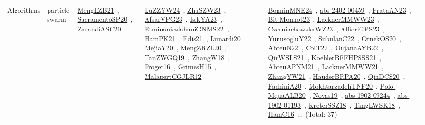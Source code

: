 {\begin{longtable}{lp{3cm}>{\raggedright\arraybackslash}p{6cm}>{\raggedright\arraybackslash}p{6cm}>{\raggedright\arraybackslash}p{8cm}}
\index{particle swarm}\index{Algorithms!particle swarm}Algorithms & particle swarm & \href{../works/MengLZB21.pdf}{MengLZB21}~\cite{MengLZB21}, \href{../works/SacramentoSP20.pdf}{SacramentoSP20}~\cite{SacramentoSP20}, \href{../works/ZarandiASC20.pdf}{ZarandiASC20}~\cite{ZarandiASC20} & \href{../works/LuZZYW24.pdf}{LuZZYW24}~\cite{LuZZYW24}, \href{../works/ZhuSZW23.pdf}{ZhuSZW23}~\cite{ZhuSZW23}, \href{../works/AfsarVPG23.pdf}{AfsarVPG23}~\cite{AfsarVPG23}, \href{../works/IsikYA23.pdf}{IsikYA23}~\cite{IsikYA23}, \href{../works/EtminaniesfahaniGNMS22.pdf}{EtminaniesfahaniGNMS22}~\cite{EtminaniesfahaniGNMS22}, \href{../works/HamPK21.pdf}{HamPK21}~\cite{HamPK21}, \href{../works/Edis21.pdf}{Edis21}~\cite{Edis21}, \href{../works/Lunardi20.pdf}{Lunardi20}~\cite{Lunardi20}, \href{../works/MejiaY20.pdf}{MejiaY20}~\cite{MejiaY20}, \href{../works/MengZRZL20.pdf}{MengZRZL20}~\cite{MengZRZL20}, \href{../works/TanZWGQ19.pdf}{TanZWGQ19}~\cite{TanZWGQ19}, \href{../works/ZhangW18.pdf}{ZhangW18}~\cite{ZhangW18}, \href{../works/Froger16.pdf}{Froger16}~\cite{Froger16}, \href{../works/GrimesH15.pdf}{GrimesH15}~\cite{GrimesH15}, \href{../works/MalapertCGJLR12.pdf}{MalapertCGJLR12}~\cite{MalapertCGJLR12} & \href{../works/BonninMNE24.pdf}{BonninMNE24}~\cite{BonninMNE24}, \href{../works/abs-2402-00459.pdf}{abs-2402-00459}~\cite{abs-2402-00459}, \href{../works/PrataAN23.pdf}{PrataAN23}~\cite{PrataAN23}, \href{../works/Bit-Monnot23.pdf}{Bit-Monnot23}~\cite{Bit-Monnot23}, \href{../works/LacknerMMWW23.pdf}{LacknerMMWW23}~\cite{LacknerMMWW23}, \href{../works/CzerniachowskaWZ23.pdf}{CzerniachowskaWZ23}~\cite{CzerniachowskaWZ23}, \href{../works/AlfieriGPS23.pdf}{AlfieriGPS23}~\cite{AlfieriGPS23}, \href{../works/YunusogluY22.pdf}{YunusogluY22}~\cite{YunusogluY22}, \href{../works/SubulanC22.pdf}{SubulanC22}~\cite{SubulanC22}, \href{../works/OrnekOS20.pdf}{OrnekOS20}~\cite{OrnekOS20}, \href{../works/AbreuN22.pdf}{AbreuN22}~\cite{AbreuN22}, \href{../works/ColT22.pdf}{ColT22}~\cite{ColT22}, \href{../works/OujanaAYB22.pdf}{OujanaAYB22}~\cite{OujanaAYB22}, \href{../works/QinWSLS21.pdf}{QinWSLS21}~\cite{QinWSLS21}, \href{../works/KoehlerBFFHPSSS21.pdf}{KoehlerBFFHPSSS21}~\cite{KoehlerBFFHPSSS21}, \href{../works/AbreuAPNM21.pdf}{AbreuAPNM21}~\cite{AbreuAPNM21}, \href{../works/LacknerMMWW21.pdf}{LacknerMMWW21}~\cite{LacknerMMWW21}, \href{../works/ZhangYW21.pdf}{ZhangYW21}~\cite{ZhangYW21}, \href{../works/HauderBRPA20.pdf}{HauderBRPA20}~\cite{HauderBRPA20}, \href{../works/QinDCS20.pdf}{QinDCS20}~\cite{QinDCS20}, \href{../works/FachiniA20.pdf}{FachiniA20}~\cite{FachiniA20}, \href{../works/MokhtarzadehTNF20.pdf}{MokhtarzadehTNF20}~\cite{MokhtarzadehTNF20}, \href{../works/Polo-MejiaALB20.pdf}{Polo-MejiaALB20}~\cite{Polo-MejiaALB20}, \href{../works/Novas19.pdf}{Novas19}~\cite{Novas19}, \href{../works/abs-1902-09244.pdf}{abs-1902-09244}~\cite{abs-1902-09244}, \href{../works/abs-1902-01193.pdf}{abs-1902-01193}~\cite{abs-1902-01193}, \href{../works/KreterSSZ18.pdf}{KreterSSZ18}~\cite{KreterSSZ18}, \href{../works/TangLWSK18.pdf}{TangLWSK18}~\cite{TangLWSK18}, \href{../works/HamC16.pdf}{HamC16}~\cite{HamC16}... (Total: 37)\\

\end{longtable}}
